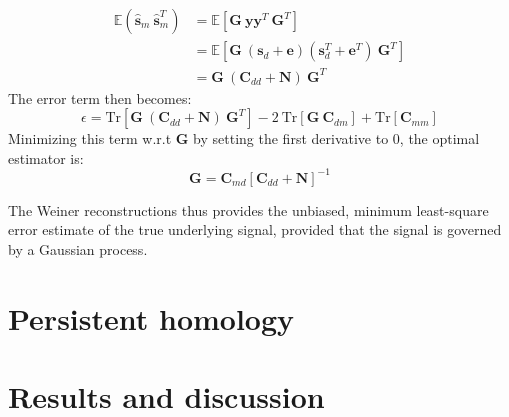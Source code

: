 \documentclass{article}
\begin{document}
\begin{align*}
\mathbb{E} (\mathbf{\hat{s}}_m\ \mathbf{\hat{s}}_m^T) &= \mathbb{E} [\mathbf{G}\ \mathbf{y}\mathbf{y}^T\ \mathbf{G}^T ] \\
   &= \mathbb{E} [\mathbf{G}\ (\mathbf{s}_d + \mathbf{e})(\mathbf{s}_d^T + \mathbf{e}^T)\ \mathbf{G}^T ] \\
   &= \mathbf{G}\  (\mathbf{C}_{dd} + \mathbf{N})\ \mathbf{G}^T
\end{align*}
The error term then becomes:
\[\epsilon = \mathrm{Tr}[\mathbf{G}\  (\mathbf{C}_{dd} + \mathbf{N})\ \mathbf{G}^T] - 2\ \mathrm{Tr}[\mathbf{G}\ \mathbf{C}_{dm}] + \mathrm{Tr}[\mathbf{C}_{mm}]
\]
Minimizing this term w.r.t $\mathbf{G}$ by setting the first derivative to 0, the optimal estimator is:
\begin{equation} \mathbf{G} = \mathbf{C}_{md}[\mathbf{C}_{dd} + \mathbf{N}]^{-1}\end{equation}

The Weiner reconstructions thus provides the unbiased, minimum least-square error estimate of the  true underlying signal, provided that the signal is governed by a Gaussian process.
\section{Persistent homology}

\section{Results and discussion}
\end{document}
